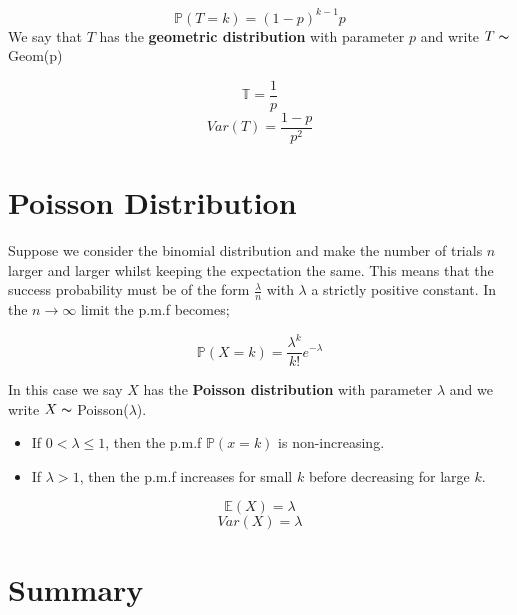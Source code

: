 \documentclass{report}
\begin{document}
\begin{equation}
    \mathbb{P}(T = k) = (1 - p)^{k-1}p 
\end{equation}
We say that $T$ has the \textbf{geometric distribution} with parameter $p$ and write $T \thicksim$ Geom(p)

\begin{equation}
    \mathbb{T} = \frac{1}{p}
\end{equation}
\begin{equation}
    Var(T) = \frac{1-p}{p^2}
\end{equation}

\section{Poisson Distribution}

Suppose we consider the binomial distribution and make the number of trials $n$ larger and larger whilst keeping the expectation the same. This means that the success probability must be of the form $\frac{\lambda}{n}$ with $\lambda$ a strictly positive constant. In the $n \longrightarrow \infty$ limit the p.m.f becomes;

\begin{equation}
    \mathbb{P}(X = k) = \frac{\lambda^k}{k!}e^{-\lambda}
\end{equation}

In this case we say $X$ has the \textbf{Poisson distribution} with parameter $\lambda$ and we write $X \thicksim$ Poisson($\lambda$).
\begin{itemize}
    \item If $0 < \lambda \leq 1$, then the p.m.f $\mathbb{P}(x = k)$ is non-increasing.
    \item If $\lambda > 1$, then the p.m.f increases for small $k$ before decreasing for large $k$.
\end{itemize}

\begin{equation}
    \mathbb{E}(X) = \lambda
\end{equation}
\begin{equation}
    Var(X) = \lambda
\end{equation}
\section{Summary}
\end{document}
